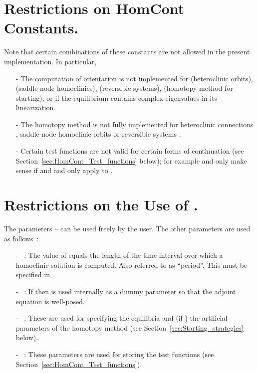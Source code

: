 \documentclass[12pt]{report}
\begin{document}
\section{ Restrictions on {\cal HomCont} Constants.}
Note that certain combinations of these constants are not allowed
in the present implementation. In particular,
\begin{itemize}
\item[-] 
The computation of orientation  is not
implemented for  (heteroclinic orbits), 
 (saddle-node homoclinics),
 (reversible systems),  (homotopy
method for starting), or if the equilibrium contains complex
eigenvalues in its linearization.  
\item[-] The homotopy method  is not fully implemented
for heteroclinic connections , saddle-node homoclinic
orbits  or reversible systems .
\item[-] Certain test functions are not valid for certain forms
of continuation 
(see Section~\ref{sec:HomCont_Test_functions} below); 
for example
 and  only make sense if 
 and  and  only apply
to .
\end{itemize}

\section{ Restrictions on the Use of .}
The parameters  --  can be used freely by
the user. The other parameters are used as follows~:

\begin{itemize}

\item[-] ~: 
The value of  equals the length of the time interval over
which a homoclinic solution is computed. Also referred to as ``period''.
This must be specified in .

\item[-] ~: 
If  then  is used internally as a
dummy parameter so that the adjoint equation is well-posed.

\item[-] ~:
These are used for specifying the 
equilibria and (if ) the artificial parameters of
the homotopy method (see Section~\ref{sec:Starting_strategies} below).

\item[-] ~: 
These parameters are used for storing the test functions 
(see Section~\ref{sec:HomCont_Test_functions}).
\end{itemize}
\end{document}
